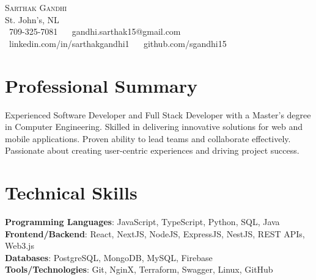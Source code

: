 \documentclass[letterpaper,11pt]{article}
\begin{document}
\begin{center}
    {\Huge \scshape Sarthak Gandhi} \\ \vspace{1pt}
    St. John's, NL \\ \vspace{1pt}
    \small \raisebox{-0.1\height}\faPhone\ 709-325-7081 ~ 
    {\raisebox{-0.2\height}\faEnvelope\  {gandhi.sarthak15@gmail.com}} ~ 
    {\raisebox{-0.2\height}\faLinkedin\ {linkedin.com/in/sarthakgandhi1}}  ~
    {\raisebox{-0.2\height}\faGithub\ {github.com/sgandhi15}}
    \vspace{-8pt}
\end{center}


\section{Professional Summary}
Experienced Software Developer and Full Stack Developer with a Master’s degree in Computer Engineering. Skilled in delivering innovative solutions for web and mobile applications. Proven ability to lead teams and collaborate effectively. Passionate about creating user-centric experiences and driving project success.
\vspace{-8pt}

\section{Technical Skills}
\begin{itemize}[leftmargin=0.15in, label={}]
\small{\item{
\textbf{Programming Languages}{: JavaScript, TypeScript, Python, SQL, Java} \\
\textbf{Frontend/Backend}{: React, NextJS, NodeJS, ExpressJS, NestJS, REST APIs, Web3.js} \\
\textbf{Databases}{: PostgreSQL, MongoDB, MySQL, Firebase} \\
\textbf{Tools/Technologies}{: Git, NginX, Terraform, Swagger, Linux, GitHub} \
}}
\end{itemize}
\vspace{-16pt}

\end{document}
